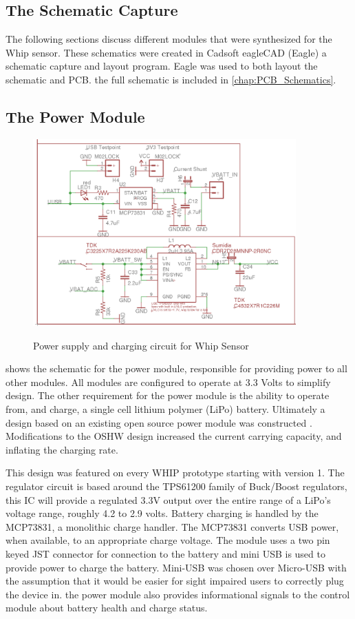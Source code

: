 \subsection {The Schematic Capture}

The following sections discuss different modules that were synthesized for the Whip sensor. These schematics were created in Cadsoft eagleCAD (Eagle) a schematic capture and layout program. Eagle was used to both layout the schematic and PCB. the full schematic is included in \cref{chap:PCB_Schematics}.


\subsection {The Power Module}
\begin{figure}
	\begin{center}
		\label{fig:Rev5_power}
		\includegraphics[scale=1,width=0.9\textwidth]{Images/Rev5_PowerSch.png} 
		\caption{Power supply and charging circuit for Whip Sensor}
	\end{center}
\end{figure}
 shows the schematic for the power module, responsible for providing power to all other modules. All modules are configured to operate at 3.3 Volts to simplify design. The other requirement for the power module is the ability to operate from, and charge, a single cell lithium polymer (LiPo) battery. Ultimately a design based on an existing open source power module was constructed \cite{Sparkfun2012}. Modifications to the OSHW design increased the current carrying capacity, and inflating the charging rate.

This design was featured on every WHIP prototype starting with version 1. The regulator circuit is based around the TPS61200 family of Buck/Boost regulators, this IC will provide a regulated 3.3V output over the entire range of a LiPo's voltage range, roughly 4.2 to 2.9 volts. Battery charging is handled by the MCP73831, a monolithic charge handler. The MCP73831 converts USB power, when available, to an appropriate charge voltage. The module uses a two pin keyed JST connector for connection to the battery and mini USB is used to provide power to charge the battery. Mini-USB was chosen over Micro-USB with the assumption that it would be easier for sight impaired users to correctly plug the device in. the power module also provides informational signals to the control module about battery health and charge status.

